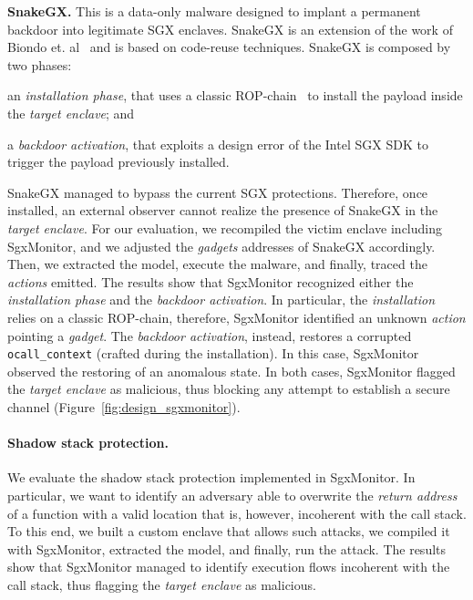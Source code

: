 \textbf{SnakeGX.}
This is a data-only malware designed to implant a permanent backdoor into 
legitimate SGX enclaves. 
\textsf{SnakeGX} is an extension of the work of Biondo et. 
al~\citep{biondo2018guard} and is based on code-reuse techniques.
\textsf{SnakeGX} is composed by two phases: 
\begin{enumerate*}[label=(\roman*)]
	\item an \emph{installation phase}, that uses a classic 
	ROP-chain~\citep{carlini2014rop} to install the payload inside 
	the \emph{target enclave}; and
	\item a \emph{backdoor activation}, that exploits a design error of the 
	Intel SGX SDK to trigger the payload previously installed.
\end{enumerate*}
\textsf{SnakeGX} managed to bypass the current SGX protections. 
Therefore, once installed, an external observer cannot realize the presence of
\textsf{SnakeGX} in the \emph{target enclave}.
For our evaluation, we recompiled the victim enclave including SgxMonitor, 
and we adjusted the \emph{gadgets} addresses of \textsf{SnakeGX} accordingly.
Then, we extracted the model, execute the malware, and finally, traced 
the \emph{actions} emitted.
The results show that SgxMonitor recognized either the 
\emph{installation phase} and the \emph{backdoor activation}.
In particular, the \emph{installation} relies on a classic ROP-chain, 
therefore, SgxMonitor identified an unknown \emph{action} pointing a 
\emph{gadget}.
The \emph{backdoor activation}, instead, restores a corrupted 
\texttt{ocall\_context} (crafted during the installation). In this case, 
SgxMonitor observed the restoring of an anomalous state.
In both cases, SgxMonitor flagged the \emph{target enclave} as 
malicious, thus blocking any attempt to establish a secure channel 
(Figure~\ref{fig:design_sgxmonitor}).


\paragraph{Shadow stack protection.}
We evaluate the shadow stack protection implemented in SgxMonitor. In 
particular, we want to identify an adversary able to overwrite the 
\emph{return address} of a function with a valid location that 
is, however, incoherent with the call stack.
To this end, we built a custom enclave that allows such attacks, we compiled it 
with SgxMonitor, extracted the model, and finally, run the attack.
The results show that SgxMonitor managed to identify execution 
flows incoherent with the call stack, thus flagging the \emph{target enclave} 
as malicious.

